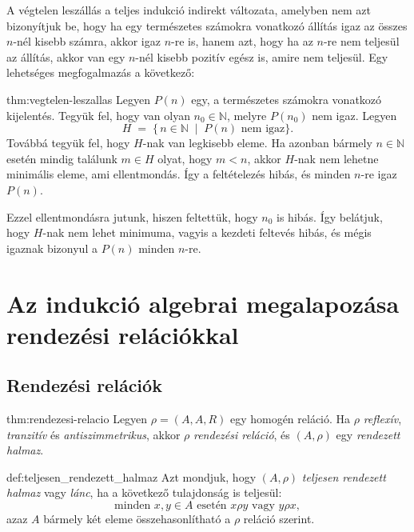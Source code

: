 A végtelen leszállás a teljes indukció indirekt változata, amelyben
nem azt bizonyítjuk be, hogy ha egy természetes számokra vonatkozó
állítás igaz az összes $n$-nél kisebb számra, akkor igaz $n$-re
is, hanem azt, hogy ha az $n$-re nem teljesül az állítás, akkor van
egy $n$-nél kisebb pozitív egész is, amire nem teljesül. Egy lehetséges
megfogalmazás a következő:
\begin{theorem}{thm:vegtelen-leszallas} Legyen $P(n)$ egy, a természetes
számokra vonatkozó kijelentés. Tegyük fel, hogy van olyan $n_{0}\in\mathbb{N}$,
melyre $P(n_{0})$ nem igaz. Legyen 
\[
H\;=\;\{\,n\in\mathbb{N}\;\mid\;P(n)\text{ nem igaz}\}.
\]
Továbbá tegyük fel, hogy $H$-nak van legkisebb eleme. Ha azonban
bármely $n\in\mathbb{N}$ esetén mindig találunk $m\in H$ olyat,
hogy $m<n$, akkor $H$-nak nem lehetne minimális eleme, ami ellentmondás.
Így a feltételezés hibás, és minden $n$-re igaz $P(n)$. 
\end{theorem}

Ezzel ellentmondásra jutunk, hiszen feltettük, hogy $n_{0}$ is hibás.
Így belátjuk, hogy $H$-nak nem lehet minimuma, vagyis a kezdeti feltevés
hibás, és mégis igaznak bizonyul a $P(n)$ minden $n$-re.

\section*{Az indukció algebrai megalapozása rendezési relációkkal}

\label{algebrai}

\subsection*{Rendezési relációk}
\begin{theorem}{thm:rendezesi-relacio} Legyen $\rho=(A,A,R)$ egy homogén
reláció. Ha $\rho$ \emph{reflexív}, \emph{tranzitív} és \emph{antiszimmetrikus},
akkor $\rho$ \emph{rendezési reláció}, és $(A,\rho)$ egy \emph{rendezett
halmaz}. 
\end{theorem}

\begin{definition}{def:teljesen_rendezett_halmaz}
Azt mondjuk, hogy $(A,\rho)$ \emph{teljesen rendezett halmaz} vagy
\emph{lánc}, ha a következő tulajdonság is teljesül: 
\[
\text{minden }x,y\in A\text{ esetén }x\rho y\text{ vagy }y\rho x,
\]
azaz $A$ bármely két eleme összehasonlítható a $\rho$ reláció szerint. 
\end{definition}

